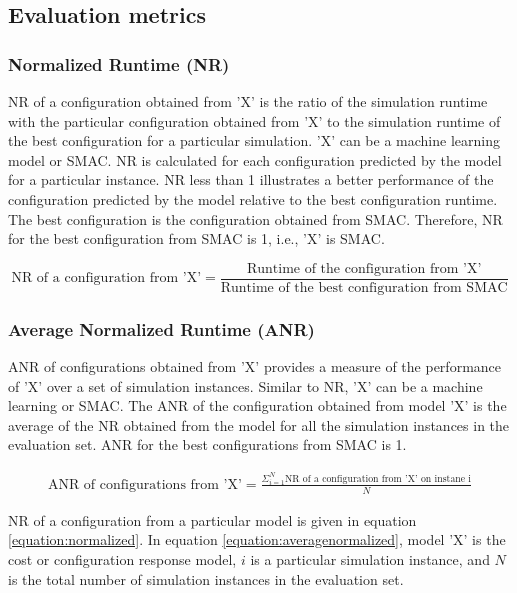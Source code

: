 \subsection{Evaluation metrics}
\label{section:evaluation_metrics}
\subsubsection{Normalized Runtime (NR)}

NR  of a configuration obtained from 'X' is the ratio of the simulation runtime with the particular configuration obtained from 'X' to the simulation runtime of the best configuration for a particular simulation. 'X' can be a machine learning model or SMAC. NR is calculated for each configuration predicted by the model for a particular instance. NR less than 1 illustrates a better performance of the configuration predicted by the model relative to the best configuration runtime. The best configuration is the configuration obtained from SMAC.  Therefore, NR for the best configuration from SMAC is 1, i.e., 'X' is SMAC. 

\begin{equation}
\text{NR of a configuration from 'X'} = \frac{\text{Runtime of the configuration from 'X'}}{\text{Runtime of the best configuration from SMAC}}   
\label{equation:normalized}
\end{equation}

\subsubsection{Average Normalized Runtime (ANR)}

ANR of configurations obtained from 'X' provides a measure of the performance of 'X' over a set of simulation instances. Similar to NR, 'X' can be a machine learning or SMAC. The ANR of the configuration obtained from model 'X' is the average of the NR obtained from the model for all the simulation instances in the evaluation set.  ANR for the best configurations from SMAC is 1.

\begin{equation}
\begin{split}
\text{ANR of configurations from 'X'} = \frac{\Sigma_{i=1}^{N} \text{{NR of a configuration from 'X' on instane i}}}{N}
\label{equation:averagenormalized}
\end{split}
\end{equation}

NR of a configuration from a particular model is given in equation \ref{equation:normalized}. In equation \ref{equation:averagenormalized}, model 'X' is the cost or configuration response model, $i$ is a particular simulation instance, and $N$ is the total number of simulation instances in the evaluation set.


